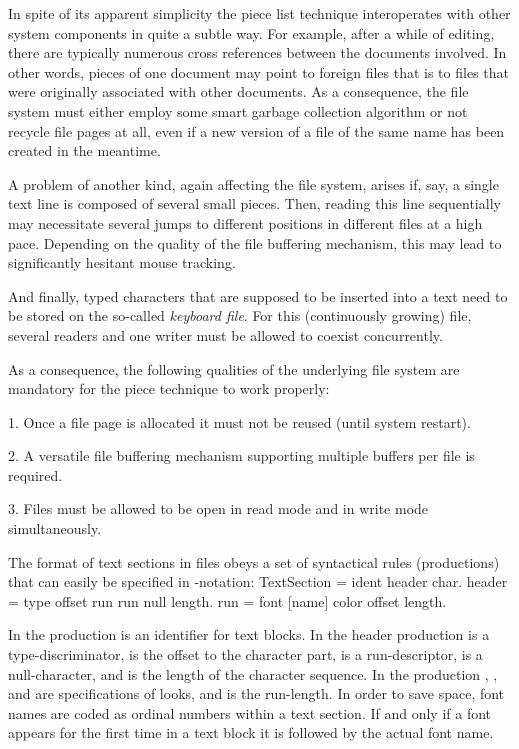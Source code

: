 In spite of its apparent simplicity the piece list technique interoperates with other system components in quite a subtle way. For example, after a while of editing, there are typically numerous cross references between the documents involved. In other words, pieces of one document may point to foreign files that is to files that were originally associated with other documents. As a consequence, the file system must either employ some smart garbage collection algorithm or not recycle file pages at all, even if a new version of a file of the same name has been created in the meantime.

A problem of another kind, again affecting the file system, arises if, say, a single text line is composed of several small pieces. Then, reading this line sequentially may necessitate several jumps to different positions in different files at a high pace. Depending on the quality of the file buffering mechanism, this may lead to significantly hesitant mouse tracking.

And finally, typed characters that are supposed to be inserted into a text need to be stored on the so-called \emph{keyboard file}. For this (continuously growing) file, several readers and one writer must be allowed to coexist concurrently.

As a consequence, the following qualities of the underlying file system are mandatory for the piece technique to work properly:

\item{1.} Once a file page is allocated it must not be reused (until system restart).
\item{2.} A versatile file buffering mechanism supporting multiple buffers per file is required.
\item{3.} Files must be allowed to be open in read mode and in write mode simultaneously.

\noindent The format of text sections in files obeys a set of syntactical rules (productions) that can easily be specified in -notation:
\begintt
TextSection = ident header {char}.
header = type offset run {run} null length.
run = font [name] color offset length.
\endtt

\noindent In the  production  is an identifier for text blocks. In the header production  is a type-discriminator,  is the offset to the character part,  is a run-descriptor,  is a null-character, and  is the length of the character sequence. In the  production , , and  are specifications of looks, and  is the run-length. In order to save space, font names are coded as ordinal numbers within a text section. If and only if a font appears for the first time in a text block it is followed by the actual font name.

